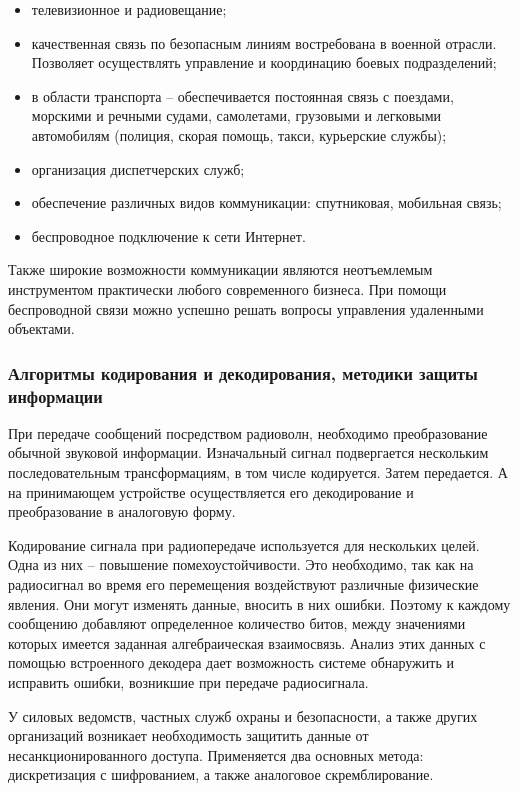 \documentclass[a4paper]{report}
\begin{document}
\begin{itemize}
\item телевизионное и радиовещание;
\item качественная связь по безопасным линиям востребована в военной отрасли. Позволяет осуществлять управление и координацию боевых подразделений;
\item в области транспорта – обеспечивается постоянная связь с поездами, морскими и речными судами, самолетами, грузовыми и легковыми автомобилям (полиция, скорая помощь, такси, курьерские службы);
\item организация диспетчерских служб;
\item обеспечение различных видов коммуникации: спутниковая, мобильная связь;
\item беспроводное подключение к сети Интернет.
\end{itemize}

Также широкие возможности коммуникации являются неотъемлемым инструментом практически любого современного бизнеса. При помощи беспроводной связи можно успешно решать вопросы управления удаленными объектами.

\subsubsection{Алгоритмы кодирования и декодирования, методики защиты информации}
При передаче сообщений посредством радиоволн, необходимо преобразование обычной звуковой информации. Изначальный сигнал подвергается нескольким последовательным трансформациям, в том числе кодируется. Затем передается. А на принимающем устройстве осуществляется его декодирование и преобразование в аналоговую форму.

Кодирование сигнала при радиопередаче используется для нескольких целей. Одна из них – повышение помехоустойчивости. Это необходимо, так как на радиосигнал во время его перемещения воздействуют различные физические явления. Они могут изменять данные, вносить в них ошибки. Поэтому к каждому сообщению добавляют определенное количество битов, между значениями которых имеется заданная алгебраическая взаимосвязь. Анализ этих данных с помощью встроенного декодера дает возможность системе обнаружить и исправить ошибки, возникшие при передаче радиосигнала.

У силовых ведомств, частных служб охраны и безопасности, а также других организаций возникает необходимость защитить данные от несанкционированного доступа. Применяется два основных метода: дискретизация с шифрованием, а также аналоговое скремблирование.
\end{document}
